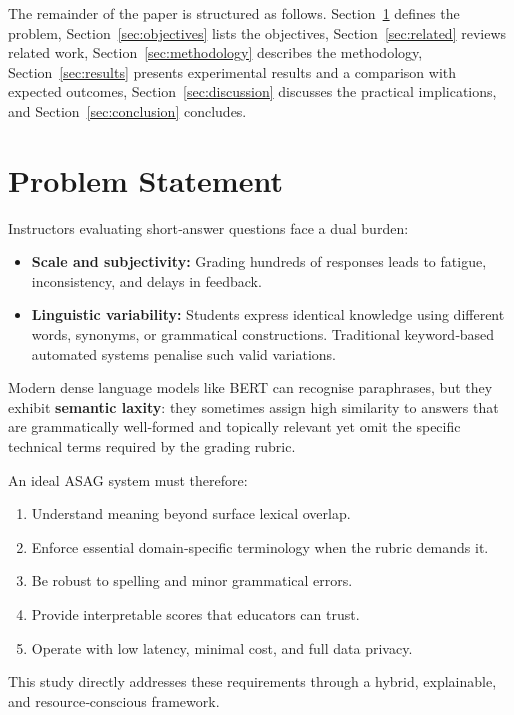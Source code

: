 \documentclass[11pt,a4paper]{article}
\begin{document}
The remainder of the paper is structured as follows. Section~\ref{sec:problem} defines the problem, Section~\ref{sec:objectives} lists the objectives, Section~\ref{sec:related} reviews related work, Section~\ref{sec:methodology} describes the methodology, Section~\ref{sec:results} presents experimental results and a comparison with expected outcomes, Section~\ref{sec:discussion} discusses the practical implications, and Section~\ref{sec:conclusion} concludes.

\section{Problem Statement}
\label{sec:problem}
Instructors evaluating short‑answer questions face a dual burden:
\begin{itemize}[noitemsep]
\item \textbf{Scale and subjectivity:} Grading hundreds of responses leads to fatigue, inconsistency, and delays in feedback.
\item \textbf{Linguistic variability:} Students express identical knowledge using different words, synonyms, or grammatical constructions. Traditional keyword‑based automated systems penalise such valid variations.
\end{itemize}

Modern dense language models like BERT can recognise paraphrases, but they exhibit \textbf{semantic laxity}: they sometimes assign high similarity to answers that are grammatically well‑formed and topically relevant yet omit the specific technical terms required by the grading rubric.

An ideal ASAG system must therefore:
\begin{enumerate}[noitemsep]
\item Understand meaning beyond surface lexical overlap.
\item Enforce essential domain‑specific terminology when the rubric demands it.
\item Be robust to spelling and minor grammatical errors.
\item Provide interpretable scores that educators can trust.
\item Operate with low latency, minimal cost, and full data privacy.
\end{enumerate}

This study directly addresses these requirements through a hybrid, explainable, and resource‑conscious framework.
\end{document}
